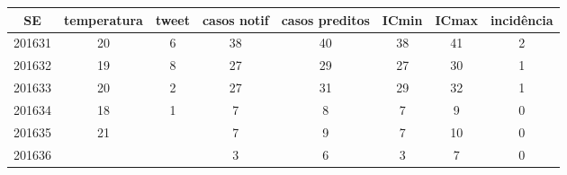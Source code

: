 \begin{tabular}{c|ccccccc}
  \hline
SE & temperatura & tweet & casos notif & casos preditos & ICmin & ICmax & incidência \\ 
  \hline
201631 & 20 & 6 & 38 & 40 & 38 & 41 & 2 \\ 
  201632 & 19 & 8 & 27 & 29 & 27 & 30 & 1 \\ 
  201633 & 20 & 2 & 27 & 31 & 29 & 32 & 1 \\ 
  201634 & 18 & 1 & 7 & 8 & 7 & 9 & 0 \\ 
  201635 & 21 &  & 7 & 9 & 7 & 10 & 0 \\ 
  201636 &  &  & 3 & 6 & 3 & 7 & 0 \\ 
   \hline
\end{tabular}
